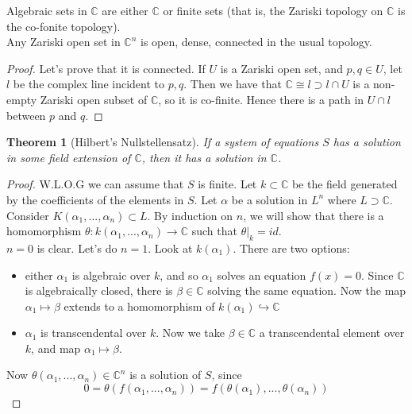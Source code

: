 \documentclass[12pt]{article}
\newtheorem{theorem}{Theorem}[section]
\theoremstyle{remark}
\newcommand{\C}{\mathbb{C}}
\begin{document}
Algebraic sets in $\C$ are either $\C$ or finite sets (that is, the Zariski topology on $\C$ is the co-fonite topology).\\

Any Zariski open set in $\C^n$ is open, dense, connected in the usual topology.

\begin{proof}
Let's prove that it is connected. If $U$ is a Zariski open set, and $p,q \in U$, let $l$ be the complex line incident to $p,q$. Then we have that $\C \cong l \supset l \cap U$ is a non-empty Zariski open subset of $\C$, so it is co-finite. Hence there is a path in $U \cap l$ between $p$ and $q$.
\end{proof}


\begin{theorem}[Hilbert's Nullstellensatz]

If a system of equations $S$ has a solution in some field extension of $\C$, then it has a solution in $\C$.
\end{theorem}

\begin{proof}
W.L.O.G we can assume that $S$ is finite. Let $k \subset \C$ be the field generated by the coefficients of the elements in $S$. Let $\alpha$ be a solution in $L^n$ where $L \supset \C$. Consider $K(\alpha_1,...,\alpha_n) \subset L$. By induction on $n$, we will show that there is a homomorphism $\theta: k(\alpha_1,...,\alpha_n) \rightarrow \C$ such that $\theta|_k = id$. \\

$n = 0$ is clear. Let's do $n=1$. Look at $k(\alpha_1)$. There are two options: 
\begin{itemize}

\item either $\alpha_1$ is algebraic over $k$, and so $\alpha_1$ solves an equation $f(x) = 0$. 
Since $\C$ is algebraically closed, there is $\beta \in \C$ solving the same equation. 
Now the map $\alpha_1 \mapsto \beta$ extends to a homomorphism of $k(\alpha_1) \hookrightarrow \C$

\item $\alpha_1$ is transcendental over $k$. 
Now we take $\beta \in \C$ a transcendental element over $k$, and map $\alpha_1 \mapsto \beta$.
\end{itemize}

Now $\theta(\alpha_1,...,\alpha_n) \in \C^n$ is a solution of $S$, since $$0 = \theta(f(\alpha_1,...,\alpha_n)) = f(\theta(\alpha_1),...,\theta(\alpha_n))$$
\end{proof}
\end{document}
